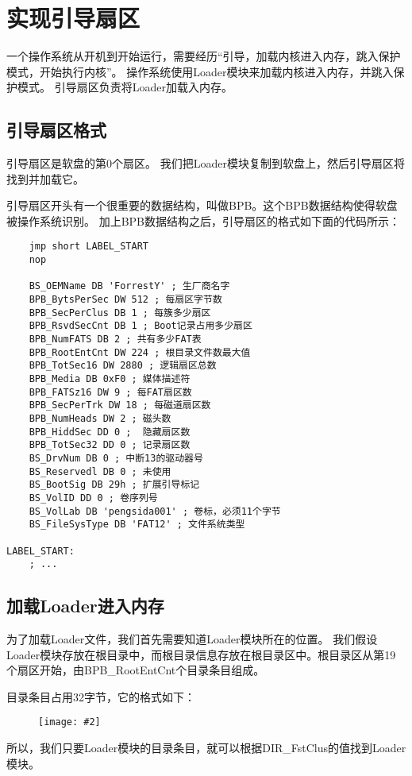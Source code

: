 \documentclass[a4paper,left=2.5cm,right=2.5cm,11pt]{article}
\newcommand{\sizedfic}[2]{\begin{figure}[H]
		\center
		\texttt{[image: \#2]}
	\end{figure}}
\begin{document}
\tableofcontents

\clearpage

\section{实现引导扇区}
	一个操作系统从开机到开始运行，需要经历“引导，加载内核进入内存，跳入保护模式，开始执行内核”。
	操作系统使用Loader模块来加载内核进入内存，并跳入保护模式。
	引导扇区负责将Loader加载入内存。
\subsection{引导扇区格式}
	引导扇区是软盘的第0个扇区。
	我们把Loader模块复制到软盘上，然后引导扇区将找到并加载它。\par
	引导扇区开头有一个很重要的数据结构，叫做BPB。这个BPB数据结构使得软盘被操作系统识别。
	加上BPB数据结构之后，引导扇区的格式如下面的代码所示：
	\begin{lstlisting}
	jmp short LABEL_START
	nop

	BS_OEMName DB 'ForrestY' ; 生厂商名字
	BPB_BytsPerSec DW 512 ; 每扇区字节数
	BPB_SecPerClus DB 1 ; 每簇多少扇区
	BPB_RsvdSecCnt DB 1 ; Boot记录占用多少扇区
	BPB_NumFATS DB 2 ; 共有多少FAT表
	BPB_RootEntCnt DW 224 ; 根目录文件数最大值
	BPB_TotSec16 DW 2880 ; 逻辑扇区总数
	BPB_Media DB 0xF0 ; 媒体描述符
	BPB_FATSz16 DW 9 ; 每FAT扇区数
	BPB_SecPerTrk DW 18 ; 每磁道扇区数
	BPB_NumHeads DW 2 ; 磁头数
	BPB_HiddSec DD 0 ;  隐藏扇区数
	BPB_TotSec32 DD 0 ; 记录扇区数
	BS_DrvNum DB 0 ; 中断13的驱动器号
	BS_Reservedl DB 0 ; 未使用
	BS_BootSig DB 29h ; 扩展引导标记
	BS_VolID DD 0 ; 卷序列号
	BS_VolLab DB 'pengsida001' ; 卷标，必须11个字节
	BS_FileSysType DB 'FAT12' ; 文件系统类型

LABEL_START:
	; ...
	\end{lstlisting}

\subsection{加载Loader进入内存}
	为了加载Loader文件，我们首先需要知道Loader模块所在的位置。
	我们假设Loader模块存放在根目录中，而根目录信息存放在根目录区中。根目录区从第19个扇区开始，由BPB\_RootEntCnt个目录条目组成。\par
	目录条目占用32字节，它的格式如下：
	\sizedfic{0.5}{1.png}

	所以，我们只要Loader模块的目录条目，就可以根据DIR\_FstClus的值找到Loader模块。
\end{document}
